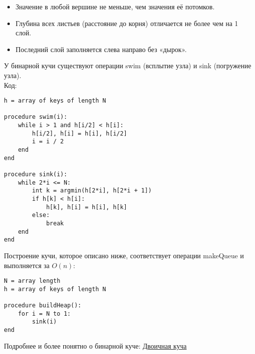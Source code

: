 \begin{itemize}
\item Значение в любой вершине не меньше, чем значения её потомков.
\item Глубина всех листьев (расстояние до корня) отличается не более чем на 1 слой.
\item Последний слой заполняется слева направо без «дырок».
\end{itemize}
У бинарной кучи существуют операции swim (всплытие узла) и sink (погружение узла).\\
Код:
\begin{verbatim}
h = array of keys of length N

procedure swim(i):
    while i > 1 and h[i/2] < h[i]:
        h[i/2], h[i] = h[i], h[i/2]
        i = i / 2
    end
end

procedure sink(i):
    while 2*i <= N:
        int k = argmin(h[2*i], h[2*i + 1])
        if h[k] < h[i]:
            h[k], h[i] = h[i], h[k]
        else:
            break
    end
end
\end{verbatim}
Построение кучи, которое описано ниже, соответствует операции makeQueue и выполняется за $O(n)$:
\begin{verbatim}
N = array length
h = array of keys of length N

procedure buildHeap():
    for i = N to 1:
        sink(i)
end
\end{verbatim}
Подробнее и более понятно о бинарной куче: \href{https://clck.ru/ScTWD}{Двоичная куча}\\

